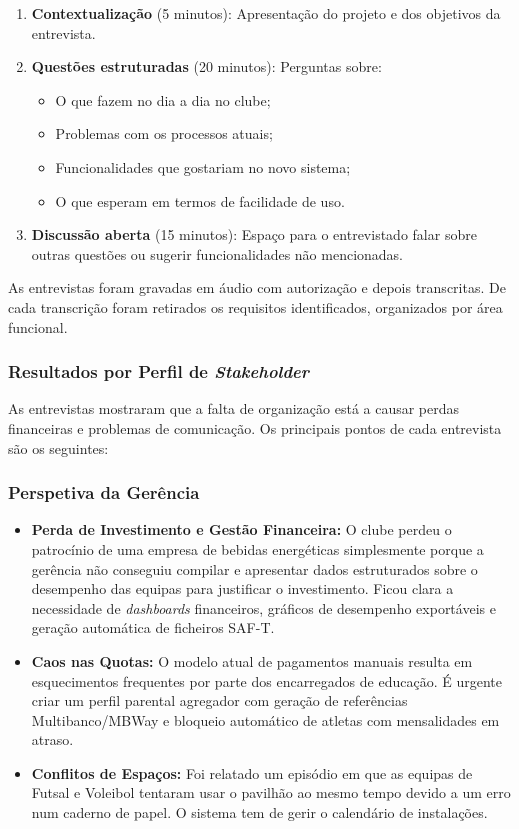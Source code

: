 \begin{enumerate}
    \item \textbf{Contextualização} (5 minutos): Apresentação do projeto e dos objetivos da entrevista.

    \item \textbf{Questões estruturadas} (20 minutos): Perguntas sobre:
    \begin{itemize}
        \item O que fazem no dia a dia no clube;
        \item Problemas com os processos atuais;
        \item Funcionalidades que gostariam no novo sistema;
        \item O que esperam em termos de facilidade de uso.
    \end{itemize}

    \item \textbf{Discussão aberta} (15 minutos): Espaço para o entrevistado falar sobre outras questões ou sugerir funcionalidades não mencionadas.
\end{enumerate}

As entrevistas foram gravadas em áudio com autorização e depois transcritas. De cada transcrição foram retirados os requisitos identificados, organizados por área funcional.

\subsubsection{Resultados por Perfil de \textit{Stakeholder}}

As entrevistas mostraram que a falta de organização está a causar perdas financeiras e problemas de comunicação. Os principais pontos de cada entrevista são os seguintes:

\subsubsection*{Perspetiva da Gerência}
\begin{itemize}
    \item \textbf{Perda de Investimento e Gestão Financeira:} O clube perdeu o patrocínio de uma empresa de bebidas energéticas simplesmente porque a gerência não conseguiu compilar e apresentar dados estruturados sobre o desempenho das equipas para justificar o investimento. Ficou clara a necessidade de \textit{dashboards} financeiros, gráficos de desempenho exportáveis e geração automática de ficheiros SAF-T.
    \item \textbf{Caos nas Quotas:} O modelo atual de pagamentos manuais resulta em esquecimentos frequentes por parte dos encarregados de educação. É urgente criar um perfil parental agregador com geração de referências Multibanco/MBWay e bloqueio automático de atletas com mensalidades em atraso.
    \item \textbf{Conflitos de Espaços:} Foi relatado um episódio em que as equipas de Futsal e Voleibol tentaram usar o pavilhão ao mesmo tempo devido a um erro num caderno de papel. O sistema tem de gerir o calendário de instalações.
\end{itemize}

